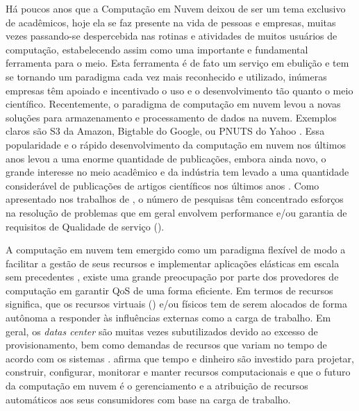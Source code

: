 Há poucos anos que a Computação em Nuvem deixou de ser um tema exclusivo de acadêmicos, hoje ela se faz presente na vida de pessoas e empresas, muitas vezes passando-se despercebida nas rotinas e atividades de muitos usuários de computação, estabelecendo assim como uma importante e fundamental ferramenta para o meio. Esta ferramenta é de fato um serviço em ebulição e tem se tornando um paradigma cada vez mais reconhecido e utilizado, inúmeras empresas têm apoiado e incentivado o uso e o desenvolvimento tão quanto o meio científico. Recentemente, o paradigma de computação em nuvem levou a novas soluções para armazenamento e processamento de dados na nuvem. Exemplos claros são S3 da Amazon, Bigtable do Google, ou PNUTS do Yahoo \cite{Binnig2009}. Essa popularidade e o rápido desenvolvimento da computação em nuvem nos últimos anos levou a uma enorme quantidade de publicações, embora ainda novo, o grande interesse no meio acadêmico e da indústria tem levado a uma quantidade considerável de publicações de artigos científicos nos últimos anos \cite{Heilig2014}.
Como apresentado nos trabalhos de \cite{Heilig2014, Yang2012}, o  número de pesquisas têm concentrado esforços na resolução de problemas que em geral envolvem performance e/ou garantia de requisitos de Qualidade de serviço (\textit{}). 

A computação em nuvem tem emergido como um paradigma flexível de modo a facilitar a gestão de seus recursos e implementar aplicações elásticas em escala sem precedentes \cite{Cervino2012}, existe uma grande preocupação por parte dos provedores de computação em garantir QoS de uma forma eficiente. Em termos de recursos significa, que os recursos virtuais (\textit{}) e/ou físicos tem de serem alocados de forma autônoma a responder às influências externas como a carga de trabalho. Em geral, os \textit{datas center} são muitas vezes subutilizados devido ao excesso de provisionamento, bem como demandas de recursos que variam no tempo de acordo com os sistemas \cite{Padala2007}. \cite{Inomata2011} afirma que tempo e dinheiro são investido para projetar, construir, configurar, monitorar e manter recursos computacionais e que o futuro da computação em nuvem é o gerenciamento e a atribuição de recursos automáticos aos seus consumidores com base na carga de trabalho.

